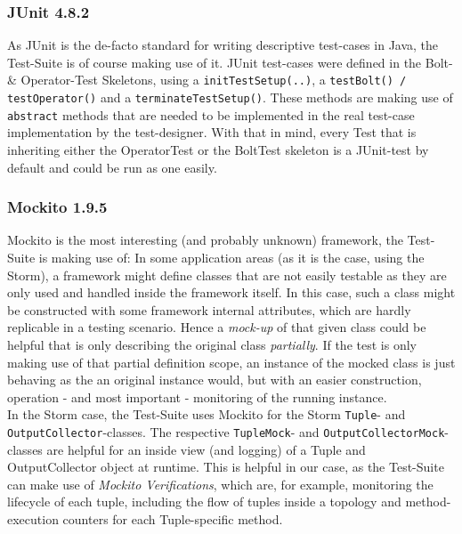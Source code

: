 	\subsubsection{JUnit 4.8.2}
		As JUnit is the de-facto standard for writing descriptive test-cases in Java, the Test-Suite is of course making use of it. JUnit test-cases were defined in the Bolt- \& Operator-Test Skeletons, using a \texttt{initTestSetup(..)}, a \texttt{testBolt() / testOperator()} and a \texttt{terminateTestSetup()}. These methods are making use of \texttt{abstract} methods that are needed to be implemented in the real test-case implementation by the test-designer. With that in mind, every Test that is inheriting either the OperatorTest or the BoltTest skeleton is a JUnit-test by default and could be run as one easily.
	
	\subsubsection{Mockito 1.9.5}
	\label{sect:Mockito}
		Mockito is the most interesting (and probably unknown) framework, the Test-Suite is making use of: In some application areas (as it is the case, using the Storm), a framework might define classes that are not easily testable as they are only used and handled inside the framework itself. In this case, such a class might be constructed with some framework internal attributes, which are hardly replicable in a testing scenario. Hence a \textit{mock-up} of that given class could be helpful that is only describing the original class \textit{partially}. If the test is only making use of that partial definition scope, an instance of the mocked class is just behaving as the an original instance would, but with an easier construction, operation - and most important - monitoring of the running instance.\\
		In the Storm case, the Test-Suite uses Mockito for the Storm \texttt{Tuple}- and \texttt{OutputCollector}-classes. The respective \texttt{TupleMock}- and \texttt{OutputCollectorMock}-classes are helpful for an inside view (and logging) of a Tuple and OutputCollector object at runtime. This is helpful in our case, as the Test-Suite can make use of \textit{Mockito Verifications}, which are, for example, monitoring the lifecycle of each tuple, including the flow of tuples inside a topology and method-execution counters for each Tuple-specific method.
	

